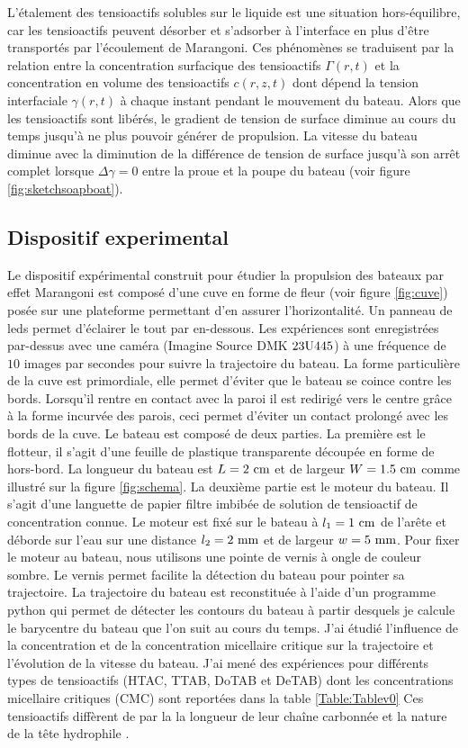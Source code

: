 \documentclass[french, 10pt]{article}
\begin{document}
\noindent L'étalement des tensioactifs solubles sur le liquide est une situation hors-équilibre, car les tensioactifs peuvent désorber et s'adsorber à l'interface en plus d'être transportés par l'écoulement de Marangoni. Ces phénomènes se traduisent par la relation entre la concentration surfacique des tensioactifs $\Gamma(r,t)$ et la concentration en volume des tensioactifs $c(r,z,t)$ dont dépend la tension interfaciale $\gamma(r,t)$ à chaque instant pendant le mouvement du bateau. Alors que les tensioactifs sont libérés, le gradient de tension de surface diminue au cours du temps jusqu'à ne plus pouvoir générer de propulsion. La vitesse du bateau diminue avec la diminution de la différence de tension de surface jusqu'à son arrêt complet lorsque $\Delta\gamma =0$ entre la proue et la poupe du bateau (voir figure \ref{fig:sketchsoapboat}).

\subsection{Dispositif experimental}

Le dispositif expérimental construit pour étudier la propulsion des bateaux par effet Marangoni est composé d'une cuve en forme de fleur (voir figure \ref{fig:cuve}) posée sur une plateforme permettant d'en assurer l'horizontalité. Un panneau de leds permet d'éclairer le tout par en-dessous. Les expériences sont enregistrées par-dessus avec une caméra (Imagine Source DMK $\rm 23U445$) à une fréquence de $10$ images par secondes pour suivre la trajectoire du bateau. La forme particulière de la cuve est primordiale, elle permet d'éviter que le bateau se coince contre les bords. Lorsqu'il rentre en contact avec la paroi il est redirigé vers le centre grâce à la forme incurvée des parois, ceci permet d'éviter un contact prolongé avec les bords de la cuve. Le bateau est composé de deux parties. La première est le flotteur, il s'agit d'une feuille de plastique transparente découpée en forme de hors-bord. La longueur du bateau est $L=2~\rm cm$ et de largeur $W = 1.5~\rm cm$ comme illustré sur la figure \ref{fig:schema}. La deuxième partie est le moteur du bateau. Il s'agit d'une languette de papier filtre imbibée de solution de tensioactif de concentration connue. Le moteur est fixé sur le bateau à $l_1 = 1~\rm cm$ de l'arête et déborde sur l'eau sur une distance $l_2 = 2~\rm mm$ et de largeur $w=5~\rm mm$. Pour fixer le moteur au bateau, nous utilisons une pointe de vernis à ongle de couleur sombre. Le vernis permet facilite la détection du bateau pour pointer sa trajectoire. La trajectoire du bateau est reconstituée à l'aide d'un programme python qui permet de détecter les contours du bateau à partir desquels je calcule le barycentre du bateau que l'on suit au cours du temps. J'ai étudié l'influence de la concentration et de la concentration micellaire critique sur la trajectoire et l'évolution de la vitesse du bateau. J'ai mené des expériences pour différents types de tensioactifs (HTAC, TTAB, DoTAB et DeTAB) dont les concentrations micellaire critiques (CMC) sont reportées dans la table \ref{Table:Tablev0} Ces tensioactifs diffèrent de par la la longueur de leur chaîne carbonnée et la nature de la tête hydrophile .
\end{document}
